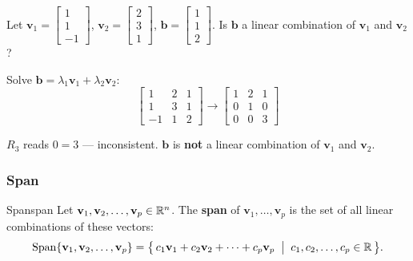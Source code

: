 \begin{example}
  Let $\mathbf{v}_1 =
    \begin{bmatrix}
      1 \\ 1 \\ -1
    \end{bmatrix}
  $,
  $\mathbf{v}_2 =
    \begin{bmatrix}
      2 \\ 3 \\ 1
    \end{bmatrix}
  $,
  $\mathbf{b} =
    \begin{bmatrix}
      1 \\ 1 \\ 2
    \end{bmatrix}
  $.
  Is $\mathbf{b}$ a linear combination of $\mathbf{v}_1$ and $\mathbf{v}_2$?

  Solve $\mathbf{b} = \lambda_1 \mathbf{v}_1 + \lambda_2 \mathbf{v}_2$:
  \[
    \left[
      \begin{array}{cc|c}
        1  & 2 & 1 \\
        1  & 3 & 1 \\
        -1 & 1 & 2
      \end{array}
      \right]
    \longrightarrow
    \left[
      \begin{array}{cc|c}
        1 & 2 & 1 \\
        0 & 1 & 0 \\
        0 & 0 & 3
      \end{array}
      \right]
  \]

  $R_3$ reads $0 = 3$ --- inconsistent. $\mathbf{b}$ is \textbf{not} a linear combination of $\mathbf{v}_1$ and $\mathbf{v}_2$.
\end{example}

\subsubsection{Span}

\begin{definition}{Span}{span}
  Let $\mathbf{v}_1, \mathbf{v}_2, \ldots, \mathbf{v}_p \in \mathbb{R}^n$. The \textbf{span} of $\mathbf{v}_1, \ldots, \mathbf{v}_p$ is the set of all linear combinations of these vectors:
  \[
    \operatorname{Span}\{\mathbf{v}_1, \mathbf{v}_2, \ldots, \mathbf{v}_p\}
    = \bigl\{\, c_1 \mathbf{v}_1 + c_2 \mathbf{v}_2 + \cdots + c_p \mathbf{v}_p \;\bigm|\; c_1, c_2, \ldots, c_p \in \mathbb{R} \,\bigr\}.
  \]
\end{definition}

